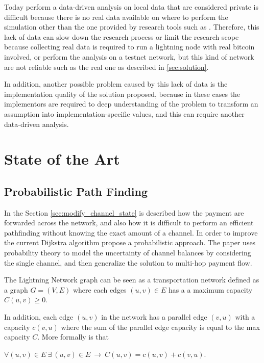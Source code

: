 Today perform a data-driven analysis on local data that are considered private
is difficult because there is no real data available on where to perform the simulation
other than the one provided by research tools such as \cite{lngossip}.
Therefore, this lack of data can slow down the research process or limit the 
research scope because collecting real data is required to run a lightning node 
with real bitcoin involved, or perform the analysis on a 
testnet network, but this kind of network are not reliable such as 
the real one as described in \ref{sec:solution}. 

In addition, another possible problem caused by this lack of data is the implementation
quality of the solution proposed, because in these cases 
the implementors are required to deep understanding of the problem 
to transform an assumption into implementation-specific values, 
and this can require another data-driven analysis.

\section{State of the Art}

\subsection{Probabilistic Path Finding}

In the Section \ref{sec:modify_channel_state} is described how the payment are
forwarded across the network, and also how it is difficult to perform an efficient 
pathfinding without knowing the exact amount of a channel. 
In order to improve the current Dijkstra algorithm \cite{DBLP:journals/corr/abs-2103-08576}
propose a probabilistic approach.
The paper \cite{DBLP:journals/corr/abs-2103-08576} uses probability theory to 
model the uncertainty of channel balances by considering the single channel, 
and then generalize the solution to multi-hop payment flow.

The Lightning Network graph can be seen as a transportation network 
defined as a graph $G = (V, E)$ where each edges $(u, v) \in E$ has a 
a maximum capacity $C(u, v) \ge 0$.

In addition, each edge $(u, v)$ in the network has a parallel edge $(v, u)$ 
with a capacity $c(v, u)$ where the sum of the parallel edge capacity is
equal to the max capacity $C$. More formally is that 

\begin{center}
    $\forall (u, v) \in E \: \exists \: (u, v) \in E \: \rightarrow \: C(u, v) = c(u, v) + c(v, u)$.
\end{center}

